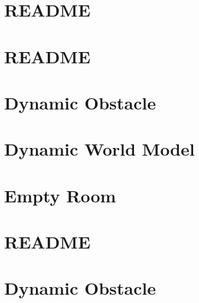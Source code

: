 \documentclass[twoside]{book}
\newcommand{\+}{\discretionary{\mbox{\scriptsize$\hookleftarrow$}}{}{}}
\begin{document}
\chapter{README}
\label{md_smacc2_sm_reference_library_sm_atomic_hierarchy_README}

\chapter{README}
\label{md_smacc2_sm_reference_library_sm_autoware_avp_README}

\chapter{Dynamic Obstacle}
\label{md_smacc2_sm_reference_library_sm_aws_warehouse_navigation_models_dynamic_obstacle_README}

\chapter{Dynamic World Model}
\label{md_smacc2_sm_reference_library_sm_aws_warehouse_navigation_models_dynamic_world_README}

\chapter{Empty Room}
\label{md_smacc2_sm_reference_library_sm_aws_warehouse_navigation_models_empty_room_README}

\chapter{README}
\label{md_smacc2_sm_reference_library_sm_branching_README}

\chapter{Dynamic Obstacle}
\label{md_smacc2_sm_reference_library_sm_dance_bot_models_dynamic_obstacle_README}

\end{document}
